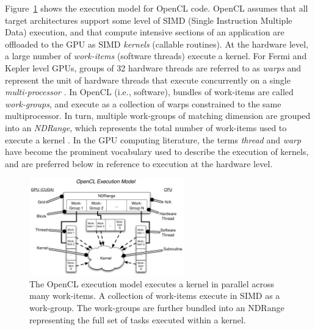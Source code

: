 \documentclass{report}
\begin{document}
Figure~\ref{fig:opencl_execute_model} shows the execution model for OpenCL code. OpenCL assumes that all target architectures support some level of SIMD (Single Instruction Multiple Data) execution, and that compute intensive sections of an application are offloaded to the GPU as SIMD \emph{kernels} (callable routines). At the hardware level, a large number of \textit{work-items} (software threads) execute a kernel. For Fermi and Kepler level GPUs, groups of 32 hardware threads are referred to as \textit{warps} and represent the unit of hardware threads that execute concurrently on a single \textit{multi-processor} \cite{CudaGuide2013}. 
In OpenCL (i.e., software), bundles of work-items are called \textit{work-groups}, and execute as a collection of warps constrained to the same multiprocessor. In turn, multiple work-groups of matching dimension are grouped into an \textit{NDRange}, which represents the total number of work-items used to execute a kernel \cite{OpenCL2009}. In the GPU computing literature, the terms \textit{thread} and \textit{warp} have become the prominent vocabulary used to describe the execution of kernels, and are preferred below in reference to execution at the hardware level. 

\begin{figure}
\centering
\includegraphics[width=0.6\textwidth]{../figures/prospectus/opencl_execute_model.pdf}
\caption{The OpenCL execution model executes a kernel in parallel across many work-items. A collection of work-items execute in SIMD as a work-group. The work-groups are further bundled into an NDRange representing the full set of tasks executed within a kernel. } 
\label{fig:opencl_execute_model}
\end{figure}

\end{document}

